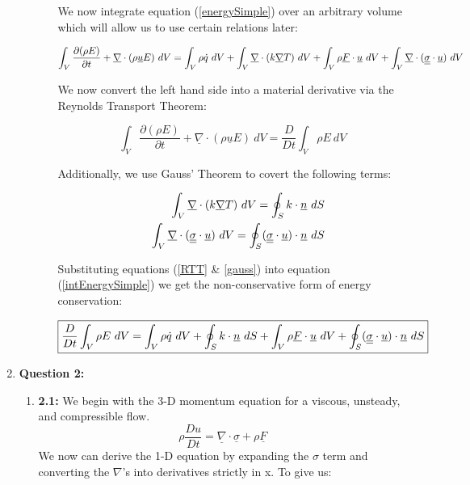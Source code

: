 \documentclass{article}
\begin{document}
\begin{enumerate}
\begin{enumerate}
\begin{enumerate}
We now integrate equation (\ref{energySimple}) over an arbitrary volume which will allow us to use certain relations later:

\begin{equation}
\int_V \frac{\partial(\rho E)}{\partial t} + \underline{\nabla}\cdot(\rho\underline{u}E)\ dV = \int_V \rho \dot{q}\ dV + \int_V \underline{\nabla}\cdot(k\underline{\nabla}T)\ dV + \int_V \rho\underline{F}\cdot\underline{u}\ dV + \int_V\underline{\nabla}\cdot(\underline{\underline{\sigma}}\cdot\underline{u})\ dV
\label{intEnergySimple}
\end{equation}

We now convert the left hand side into a material derivative via the Reynolds Transport Theorem:

\begin{equation}
\int_V \frac{\partial(\rho E)}{\partial t} + \underline{\nabla}\cdot(\rho\underline{u}E)\ dV = \frac{D}{Dt}\int_V \rho E\ dV
\label{RTT}
\end{equation}

Additionally, we use Gauss' Theorem to covert the following terms:

\begin{eqnarray}
&&\int_V \underline{\nabla}\cdot(k\underline{\nabla}T)\ dV = \oint_S k\cdot \underline{n}\ dS\nonumber \\
&&\int_V\underline{\nabla}\cdot(\underline{\underline{\sigma}}\cdot\underline{u})\ dV = \oint_S (\underline{\underline{\sigma}}\cdot\underline{u})\cdot\underline{n}\ dS
\label{gauss}
\end{eqnarray}

Substituting equations (\ref{RTT} \& \ref{gauss}) into equation (\ref{intEnergySimple}) we get the non-conservative form of energy conservation:

\begin{equation}
\boxed{\frac{D}{Dt}\int_V \rho E\ dV = \int_V \rho \dot{q}\ dV + \oint_S k\cdot \underline{n}\ dS + \int_V \rho\underline{F}\cdot\underline{u}\ dV + \oint_S (\underline{\underline{\sigma}}\cdot\underline{u})\cdot\underline{n}\ dS}
\end{equation}


\end{enumerate}

\end{enumerate}


\item \textbf{Question 2:}
\begin{enumerate}
\item \textbf{2.1:}
We begin with the 3-D momentum equation for a viscous, unsteady, and compressible flow.
\begin{equation}
\rho \frac{Du}{Dt} = \underline{\nabla}\cdot\underline{\sigma}+\rho \underline{F}
\end{equation}
We now can derive the 1-D equation by expanding the $\sigma$ term and converting the $\nabla$'s into derivatives strictly in x. To give us:


\end{enumerate}
\end{enumerate}
\end{document}

